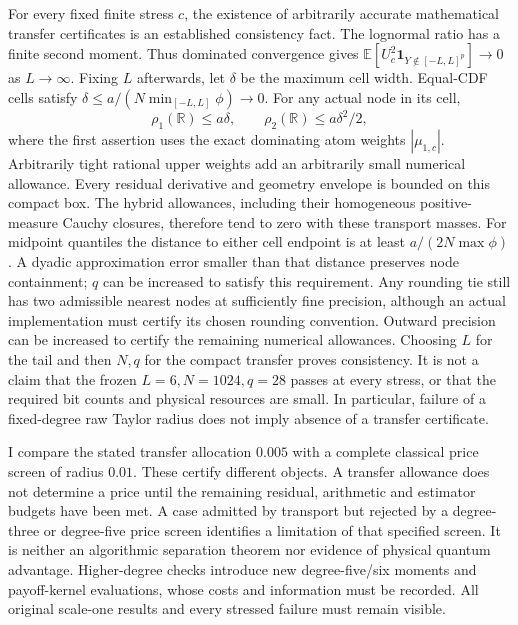 For every fixed finite stress $c$, the existence of arbitrarily accurate
mathematical transfer certificates is an established consistency fact.
The lognormal ratio has a finite second moment. Thus dominated
convergence gives
$\mathbb E[U_c^2\mathbf1_{Y\notin[-L,L]^p}]\to0$ as $L\to\infty$.
Fixing $L$ afterwards, let $\delta$ be the maximum cell width.
Equal-CDF cells satisfy
$\delta\leq a/(N\min_{[-L,L]}\phi)\to0$.
For any actual node in its cell,
\[
 \rho_1(\mathbb R)\leq a\delta,\qquad
 \rho_2(\mathbb R)\leq a\delta^2/2,
\]
where the first assertion uses the exact dominating atom weights
$|\mu_{1,c}|$. Arbitrarily tight rational upper weights add an
arbitrarily small numerical allowance. Every residual derivative and
geometry envelope is bounded on this compact box. The hybrid
allowances, including their homogeneous positive-measure Cauchy
closures, therefore tend to zero with these transport masses.
For midpoint quantiles the distance to either cell endpoint is at least
$a/(2N\max\phi)$. A dyadic approximation error smaller than that
distance preserves node containment; $q$ can be increased to satisfy
this requirement. Any rounding tie still has two admissible nearest
nodes at sufficiently fine precision, although an actual implementation
must certify its chosen rounding convention. Outward precision can be
increased to certify the remaining numerical allowances.
Choosing $L$ for the tail and then $N,q$ for the compact transfer proves
consistency. It is not a claim that the frozen $L=6,N=1024,q=28$ passes
at every stress, or that the required bit counts and physical resources
are small. In particular, failure of a fixed-degree raw Taylor radius
does not imply absence of a transfer certificate.

I compare the stated transfer allocation $0.005$ with a complete
classical price screen of radius $0.01$. These certify different
objects. A transfer allowance does not determine a price until the
remaining residual, arithmetic and estimator budgets have been met.
A case admitted by transport but rejected by a degree-three or
degree-five price screen identifies a limitation of that specified
screen. It is neither an algorithmic separation theorem nor evidence
of physical quantum advantage. Higher-degree checks introduce new
degree-five/six moments and payoff-kernel evaluations, whose costs and
information must be recorded. All original scale-one results and every
stressed failure must remain visible.
